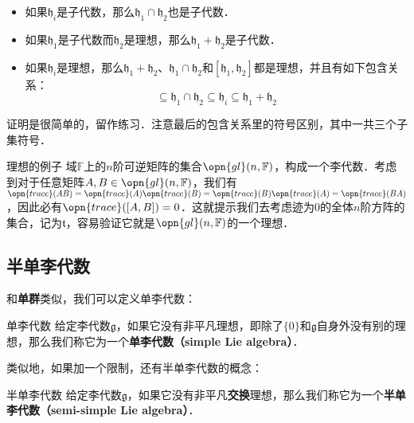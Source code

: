 \begin{itemize}
\item 如果$\mathfrak{h}_i$是子代数，那么$\mathfrak{h}_1\cap\mathfrak{h}_2$也是子代数．
\item 如果$\mathfrak{h}_1$是子代数而$\mathfrak{h}_2$是理想，那么$\mathfrak{h}_1+\mathfrak{h}_2$是子代数．
\item 如果$\mathfrak{h}_i$是理想，那么$\mathfrak{h}_1+\mathfrak{h}_2$、$\mathfrak{h}_1\cap\mathfrak{h}_2$和$[\mathfrak{h}_1, \mathfrak{h}_2]$都是理想，并且有如下包含关系：\begin{equation}
[\mathfrak{h}_1, \mathfrak{h}_2]\subseteq\mathfrak{h}_1\cap\mathfrak{h}_2\subseteq\mathfrak{h}_i\subseteq\mathfrak{h}_1+\mathfrak{h}_2
\end{equation}

\end{itemize}

证明是很简单的，留作练习．注意最后的包含关系里的符号区别，其中一共三个子集符号．

\begin{example}{理想的例子}
域$\mathbb{F}$上的$n$阶可逆矩阵的集合$\opn{gl}(n, \mathbb{F})$，构成一个李代数．考虑到对于任意矩阵$A, B\in\opn{gl}(n, \mathbb{F})$，我们有$\opn{trace}(AB)=\opn{trace}(A)\opn{trace}(B)=\opn{trace}(B)\opn{trace}(A)=\opn{trace}(BA)$，因此必有$\opn{trace}([A, B])=0$．这就提示我们去考虑迹为$0$的全体$n$阶方阵的集合，记为$\mathfrak{t}$，容易验证它就是$\opn{gl}(n, \mathbb{F})$的一个理想．
\end{example}


\subsection{半单李代数}

和\textbf{单群}类似，我们可以定义单李代数：

\begin{definition}{单李代数}
给定李代数$\mathfrak{g}$，如果它没有非平凡理想，即除了$\{0\}$和$\mathfrak{g}$自身外没有别的理想，那么我们称它为一个\textbf{单李代数（simple Lie algebra）}．
\end{definition}

类似地，如果加一个限制，还有半单李代数的概念：
\begin{definition}{半单李代数}
给定李代数$\mathfrak{g}$，如果它没有非平凡\textbf{交换}理想，那么我们称它为一个\textbf{半单李代数（semi-simple Lie algebra）}．
\end{definition}





